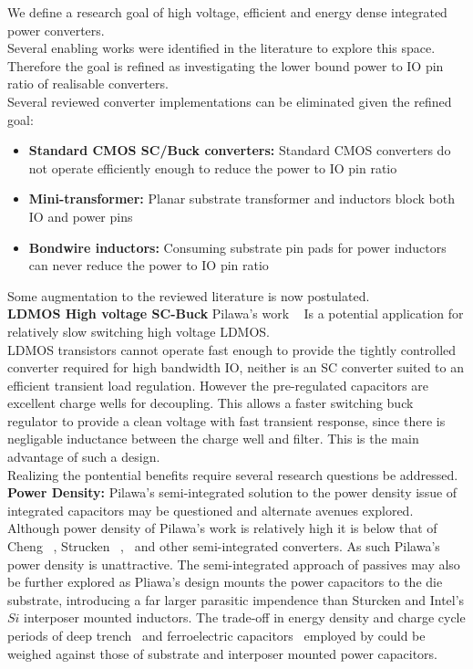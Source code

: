\documentclass[letterpaper,twocolumn,10pt]{article}
\begin{document}
We define a research goal of high voltage, efficient and energy dense integrated power converters.\\
Several enabling works were identified in the literature to explore this space. Therefore the goal is refined as investigating the lower bound power to IO pin ratio of realisable converters.\\
Several reviewed converter implementations can be eliminated given the refined goal:
\begin{itemize}
\item{\textbf{Standard CMOS SC/Buck converters: }Standard CMOS converters do not operate efficiently enough to reduce the power to IO pin ratio}
\item{\textbf{Mini-transformer: }Planar substrate transformer and inductors block both IO and power pins }
\item{\textbf{Bondwire inductors: }Consuming substrate pin pads for power inductors can never reduce the power to IO pin ratio}
\end{itemize}   
Some augmentation to the reviewed literature is now postulated.\\
\textbf{LDMOS High voltage SC-Buck}
Pilawa's work ~\cite{Pilawa2012} Is a potential application for relatively slow switching high voltage LDMOS.\\
LDMOS transistors cannot operate fast enough to provide the tightly controlled converter required for high bandwidth IO, neither is an SC converter suited to an efficient transient load regulation. However the pre-regulated capacitors are excellent charge wells for decoupling. This allows a faster switching buck regulator to provide a clean voltage with fast transient response, since there is negligable inductance between the charge well and filter. This is the main advantage of such a design.\\
Realizing the pontential benefits require several research questions be addressed.\\
\textbf{Power Density: }Pilawa's semi-integrated solution to the power density issue of integrated capacitors may be questioned and alternate avenues explored. Although power density of Pilawa's work is relatively high it is below that of Cheng ~\cite{Cheng2013}, Strucken ~\cite{Sturcken2012},~\cite{Sturcken2013} and other semi-integrated converters. As such Pilawa's power density is unattractive. The semi-integrated approach of passives may also be further explored as Pliawa's design mounts the power capacitors to the die substrate, introducing a far larger parasitic impendence than Sturcken and Intel's $Si$ interposer mounted inductors. The trade-off in energy density and charge cycle periods of deep trench~\cite{Pique} and ferroelectric capacitors~\cite{Damak2013} employed by could be weighed against those of substrate and interposer mounted power capacitors.\\   
\end{document}

